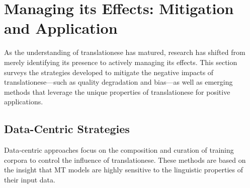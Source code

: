 \documentclass[11pt,a4paper]{article}
\begin{document}
\section{Managing its Effects: Mitigation and Application}

As the understanding of translationese has matured, research has shifted from merely identifying its presence to actively managing its effects. This section surveys the strategies developed to mitigate the negative impacts of translationese—such as quality degradation and bias—as well as emerging methods that leverage the unique properties of translationese for positive applications.

\subsection{Data-Centric Strategies}

Data-centric approaches focus on the composition and curation of training corpora to control the influence of translationese. These methods are based on the insight that MT models are highly sensitive to the linguistic properties of their input data.
\end{document}
